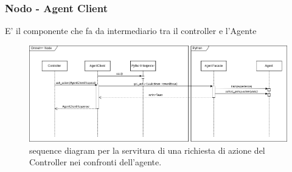 \documentclass[compress]{beamer}
\begin{document}
\subsubsection*{Nodo - Agent Client}
\begin{frame}{\subsubsecname}
    E' il componente che fa da intermediario tra il controller e l'Agente

    \begin{figure}
        \centering
        \includegraphics[width=\textwidth]{figs/agentc_sequence_diagram.drawio.png}
        \caption{sequence diagram per la servitura di una richiesta di azione del Controller nei confronti dell'agente.}
        \label{fig:agentc_sequence_diagram}
    \end{figure}
\end{frame}
\end{document}
